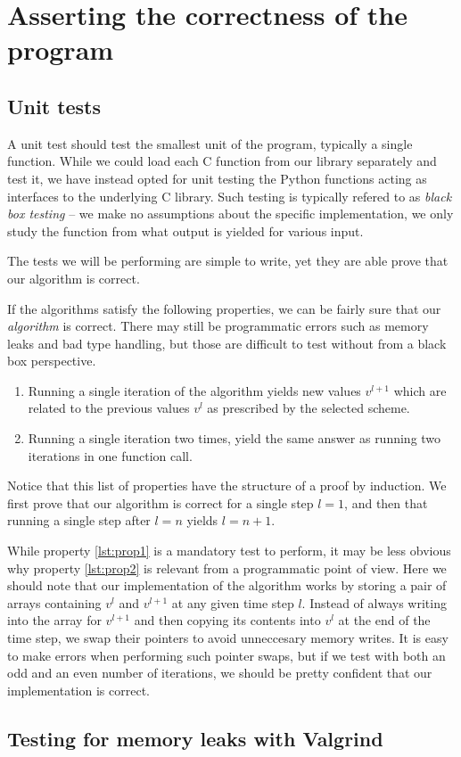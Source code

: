\section{Asserting the correctness of the program}
\subsection{Unit tests}
A unit test should test the smallest unit of the program, typically a single function. While we could load each C function from our library separately and test it, we have instead opted for unit testing the Python functions acting as interfaces to the underlying C library. Such testing is typically refered to as \emph{black box testing} -- we make no assumptions about the specific implementation, we only study the function from what output is yielded for various input.

The tests we will be performing are simple to write, yet they are able prove that our algorithm is correct.

If the algorithms satisfy the following properties, we can be fairly sure that our \emph{algorithm} is correct. There may still be programmatic errors such as memory leaks and bad type handling, but those are difficult to test without from a black box perspective.
\begin{enumerate}[label=(\roman*)]
    \item Running a single iteration of the algorithm yields new values $v^{l+1}$ which are related to the previous values $v^l$ as prescribed by the selected scheme. \label{lst:prop1}
    \item Running a single iteration two times, yield the same answer as running two iterations in one function call.\label{lst:prop2}
\end{enumerate}

Notice that this list of properties have the structure of a proof by induction. We first prove that our algorithm is correct for a single step $l = 1$, and then that running a single step after $l = n$ yields $l = n+1$.

While property \ref{lst:prop1} is a mandatory test to perform, it may be less obvious why property \ref{lst:prop2} is relevant from a programmatic point of view. Here we should note that our implementation of the algorithm works by storing a pair of arrays containing $v^l$ and $v^{l+1}$ at any given time step $l$. Instead of always writing into the array for $v^{l+1}$ and then copying its contents into $v^l$ at the end of the time step, we swap their pointers to avoid unneccesary memory writes. It is easy to make errors when performing such pointer swaps, but if we test with both an odd and an even number of iterations, we should be pretty confident that our implementation is correct.

\subsection{Testing for memory leaks with Valgrind}
